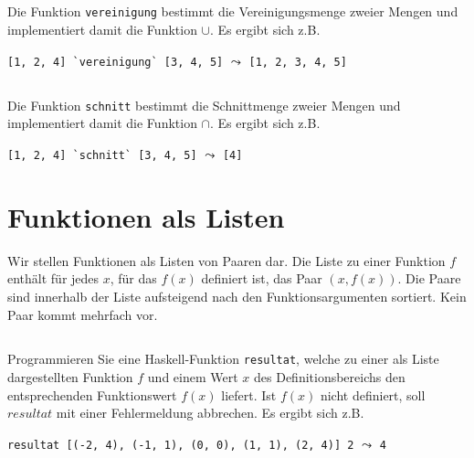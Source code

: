 \documentclass[
  10pt,                   %
  DIV12,
  german,                 %
  oneside,                %
  parskip=half,           %
  headings=normal,        %
  captions=tableheading,  %
]{scrartcl}
\begin{document}
\subsection{}
Die Funktion \lstinline|vereinigung| bestimmt die Vereinigungsmenge zweier Mengen und
implementiert damit die Funktion $\cup$. Es ergibt sich z.B.
\begin{center}
\lstinline|[1, 2, 4] `vereinigung` [3, 4, 5]|  $\leadsto$ \lstinline|[1, 2, 3, 4, 5]|
\end{center}
\subsection{}
Die Funktion \lstinline|schnitt| bestimmt die Schnittmenge zweier Mengen und implementiert
damit die Funktion $\cap$. Es ergibt sich z.B.
\begin{center}
\lstinline|[1, 2, 4] `schnitt` [3, 4, 5]| $\leadsto$ \lstinline|[4]|
\end{center}
\section{Funktionen als Listen}
Wir stellen Funktionen als Listen von Paaren dar. Die Liste zu einer Funktion $f$ enthält
für jedes $x$, für das $f (x)$ definiert ist, das Paar $(x, f(x))$. Die Paare sind innerhalb der Liste
aufsteigend nach den Funktionsargumenten sortiert. Kein Paar kommt mehrfach vor.
\subsection{}
Programmieren Sie eine Haskell-Funktion \lstinline|resultat|, welche zu
einer als Liste dargestellten Funktion $f$ und einem Wert $x$ des Definitionsbereichs
den entsprechenden Funktionswert $f(x)$ liefert. Ist $f(x)$ nicht definiert, soll $resultat$
mit einer Fehlermeldung abbrechen. Es ergibt sich z.B.
\begin{center}
\lstinline|resultat [(-2, 4), (-1, 1), (0, 0), (1, 1), (2, 4)] 2| $\leadsto$ \lstinline|4|
\end{center}
\end{document}
